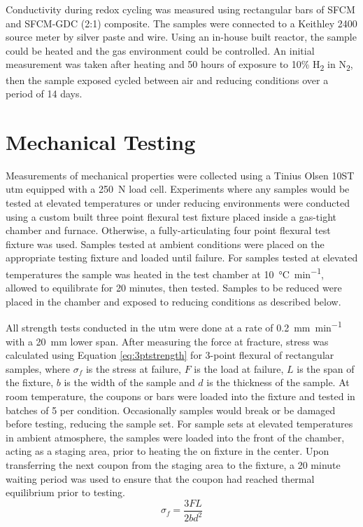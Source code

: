     Conductivity during redox cycling was measured using rectangular bars of SFCM and SFCM-GDC (2:1) composite.
    The samples were connected to a Keithley 2400 source meter by silver paste and wire.
    Using an in-house built reactor, the sample could be heated and the gas environment could be controlled.
    An initial measurement was taken after heating and 50 hours of exposure to 10\% H\textsubscript{2} in N\textsubscript{2}, then the sample exposed cycled between air and reducing conditions over a period of 14 days.

\section{Mechanical Testing}
    Measurements of mechanical properties were collected using a Tinius Olsen 10ST \gls{utm} equipped with a \SI{250}{N} load cell.
    Experiments where any samples would be tested at elevated temperatures or under reducing environments were conducted using a custom built three point flexural test fixture placed inside a gas-tight chamber and furnace.
    Otherwise, a fully-articulating four point flexural test fixture was used.
    Samples tested at ambient conditions were placed on the appropriate testing fixture and loaded until failure.
    For samples tested at elevated temperatures the sample was heated in the test chamber at \SI{10}{\celsius\per\minute}, allowed to equilibrate for 20 minutes, then tested.
    Samples to be reduced were placed in the chamber and exposed to reducing conditions as described below.


    All strength tests conducted in the \gls{utm} were done at a rate of \SI{0.2}{\milli\meter\per\minute} with a \SI{20}{\milli\meter} lower span.
    After measuring the force at fracture, stress was calculated using Equation \ref{eq:3ptstrength}
    for 3-point flexural of rectangular samples, where \(\sigma_{f}\) is the stress at failure, $F$ is the load at failure, $L$ is the span of the fixture, $b$ is the width of the sample and $d$ is the thickness of the sample.
    At room temperature, the coupons or bars were loaded into the fixture and tested in batches of 5 per condition.
    Occasionally samples would break or be damaged before testing, reducing the sample set.
    For sample sets at elevated temperatures in ambient atmosphere, the samples were loaded into the front of the chamber, acting as a staging area,
    prior to heating the on fixture in the center.
    Upon transferring the next coupon from the staging area to the fixture, a 20 minute waiting period was used to ensure that the coupon had reached thermal equilibrium prior to testing.
    \begin{equation}
        \sigma_{f} = \frac{3FL}{2bd^{2}}
        \label{eq:3ptstrength}
    \end{equation}

